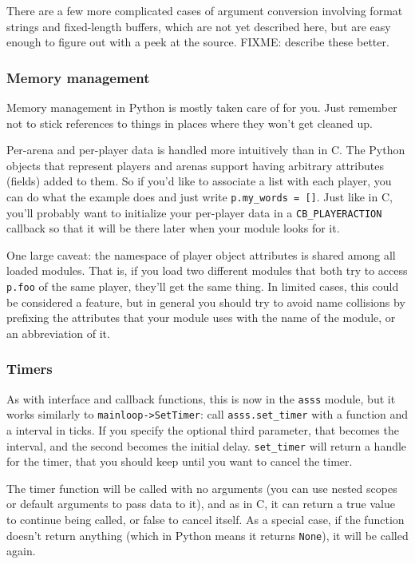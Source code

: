 \documentclass{article}
\begin{document}
There are a few more complicated cases of argument conversion involving
format strings and fixed-length buffers, which are not yet described
here, but are easy enough to figure out with a peek at the source.
FIXME: describe these better.


\subsubsection{Memory management}

Memory management in Python is mostly taken care of for you. Just
remember not to stick references to things in places where they won't
get cleaned up.

Per-arena and per-player data is handled more intuitively than in C. The
Python objects that represent players and arenas support having
arbitrary attributes (fields) added to them. So if you'd like to
associate a list with each player, you can do what the example does and
just write \verb/p.my_words = []/. Just like in C, you'll probably want
to initialize your per-player data in a \verb/CB_PLAYERACTION/ callback
so that it will be there later when your module looks for it.

One large caveat: the namespace of player object attributes is shared
among all loaded modules. That is, if you load two different modules
that both try to access \verb/p.foo/ of the same player, they'll get the
same thing. In limited cases, this could be considered a feature, but in
general you should try to avoid name collisions by prefixing the
attributes that your module uses with the name of the module, or an
abbreviation of it.


\subsubsection{Timers}

As with interface and callback functions, this is now in the \verb/asss/
module, but it works similarly to \verb/mainloop->SetTimer/: call
\verb/asss.set_timer/ with a function and a interval in ticks. If you
specify the optional third parameter, that becomes the interval, and the
second becomes the initial delay. \verb/set_timer/ will return a handle
for the timer, that you should keep until you want to cancel the timer.

The timer function will be called with no arguments (you can use nested
scopes or default arguments to pass data to it), and as in C, it can
return a true value to continue being called, or false to cancel itself.
As a special case, if the function doesn't return anything (which in
Python means it returns \verb/None/), it will be called again.
\end{document}
